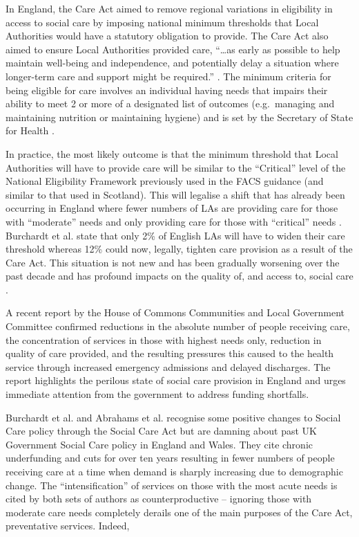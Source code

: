 \documentclass[12pt,]{report}
\begin{document}
In England, the Care Act \citeyearpar{RN176} aimed to remove regional
variations in eligibility in access to social care by imposing national
minimum thresholds that Local Authorities would have a statutory
obligation to provide. The Care Act also aimed to ensure Local
Authorities provided care, ``\ldots{}as early as possible to help
maintain well-being and independence, and potentially delay a situation
where longer-term care and support might be required.''
\citep[pp.2]{RN169}. The minimum criteria for being eligible for care
involves an individual having needs that impairs their ability to meet 2
or more of a designated list of outcomes (e.g.~managing and maintaining
nutrition or maintaining hygiene) \citep{RN169} and is set by the
Secretary of State for Health \citep{RN177}.

In practice, the most likely outcome is that the minimum threshold that
Local Authorities will have to provide care will be similar to the
``Critical'' level of the National Eligibility Framework previously used
in the FACS guidance \citep{RN173, RN177} (and similar to that used in
Scotland). This will legalise a shift that has already been occurring in
England where fewer numbers of LAs are providing care for those with
``moderate'' needs and only providing care for those with ``critical''
needs \citep{RN173, RN177}. Burchardt et al. \citeyearpar{RN173} state
that only 2\% of English LAs will have to widen their care threshold
whereas 12\% could now, legally, tighten care provision as a result of
the Care Act. This situation is not new and has been gradually worsening
over the past decade and has profound impacts on the quality of, and
access to, social care \citep{RN374}.

A recent report by the House of Commons Communities and Local Government
Committee \citeyearpar{RN287} confirmed reductions in the absolute
number of people receiving care, the concentration of services in those
with highest needs only, reduction in quality of care provided, and the
resulting pressures this caused to the health service through increased
emergency admissions and delayed discharges. The report highlights the
perilous state of social care provision in England and urges immediate
attention from the government to address funding shortfalls.

Burchardt et al. \citeyearpar{RN173} and Abrahams et al.
\citeyearpar{RN177} recognise some positive changes to Social Care
policy through the Social Care Act but are damning about past UK
Government Social Care policy in England and Wales. They cite chronic
underfunding and cuts for over ten years resulting in fewer numbers of
people receiving care at a time when demand is sharply increasing due to
demographic change. The ``intensification'' of services on those with
the most acute needs is cited by both sets of authors as
counterproductive -- ignoring those with moderate care needs completely
derails one of the main purposes of the Care Act, preventative services.
Indeed,
\end{document}
